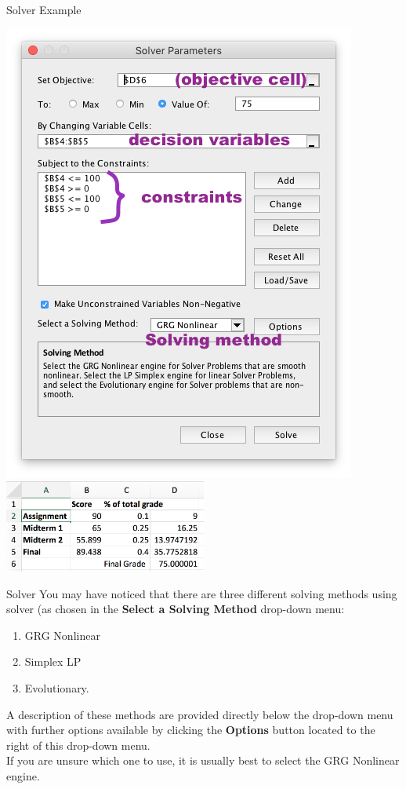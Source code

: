 \documentclass[xcolor=svgnames, handout]{beamer}
\begin{document}
\begin{frame}{Solver Example}
\begin{center}
\includegraphics[height = 0.8\textheight]{solverparameters}
\includegraphics[width = 0.5\textwidth]{solverresult}
\end{center}

\end{frame}


\begin{frame}{Solver}
You may have noticed that there are three different solving methods using solver (as chosen in the {\bf Select a Solving Method} drop-down menu:
\begin{enumerate}
\item       GRG Nonlinear
\item       Simplex LP
\item  Evolutionary.
\end{enumerate}
\medskip
A description of these methods are provided directly below the drop-down menu with further options available by clicking the {\bf Options} button located to the right of this drop-down menu.\\
\medskip
If you are unsure which one to use, it is usually best to select the GRG Nonlinear engine.
\end{frame}
\end{document}
